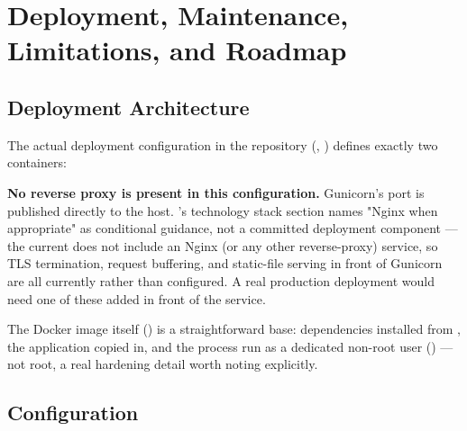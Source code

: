 \chapter{Deployment, Maintenance, Limitations, and Roadmap}

\section{Deployment Architecture}

The actual deployment configuration in the repository
(, ) defines exactly two
containers:

\begin{center}
\end{center}

\textbf{No reverse proxy is present in this configuration.} Gunicorn's
port is published directly to the host. 's technology
stack section names "Nginx when appropriate" as conditional guidance,
not a committed deployment component --- the current
 does not include an Nginx (or any other
reverse-proxy) service, so TLS termination, request buffering, and
static-file serving in front of Gunicorn are all currently \PLANNED{}
rather than configured. A real production deployment would need one of
these added in front of the  service.

The Docker image itself () is a straightforward
 base: dependencies installed from
, the application copied in, and the process run
as a dedicated non-root  user () --- not root, a real hardening detail worth
noting explicitly.

\section{Configuration}

